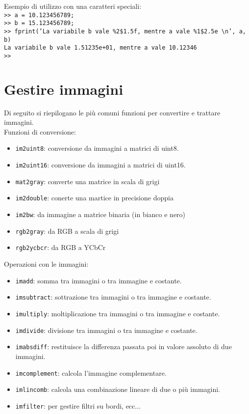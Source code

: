 Esempio di utilizzo con una caratteri speciali: \\
\texttt{>> a = 10.123456789;} \\
\texttt{>> b = 15.123456789;} \\
\texttt{>> fprint('La variabile b vale \%2\$1.5f, mentre a vale \%1\$2.5e \textbackslash n', a, b)} \\
\texttt{La variabile b vale 1.51235e+01, mentre a vale 10.12346} \\
\texttt{>> } \\

\section{Gestire immagini}
Di seguito si riepilogano le più comuni funzioni per convertire e trattare immagini.\\

Funzioni di conversione: \\
\begin{itemize}
    \item	\texttt{im2uint8}: conversione da immagini a matrici di uint8.
    \item	\texttt{im2uint16}: conversione da immagini a matrici di uint16.
    \item	\texttt{mat2gray}: converte una matrice in scala di grigi
    \item	\texttt{im2double}: conerte una martice in precisione doppia
    \item	\texttt{im2bw}: da immagine a matrice binaria (in bianco e nero)
    \item	\texttt{rgb2gray}: da RGB a scala di grigi
    \item	\texttt{rgb2ycbcr}: da RGB a YCbCr
\end{itemize}

Operazioni con le immagini: \\

\begin{itemize}
    \item	\texttt{imadd}: somma tra immagini o tra immagine e costante.
    \item	\texttt{imsubtract}: sottrazione tra immagini o tra immagine e costante.
    \item	\texttt{imultiply}: moltiplicazione tra immagini o tra immagine e costante.
    \item	\texttt{imdivide}: divisione tra immagini o tra immagine e costante.
    \item	\texttt{imabsdiff}: restituisce la differenza passata poi in valore assoluto di due immagini.
    \item	\texttt{imcomplement}: calcola l'immagine complementare.
    \item	\texttt{imlincomb}: calcola una combinazione lineare di due o più immagini.
    \item	\texttt{imfilter}: per gestire filtri su bordi, ecc...
\end{itemize}

